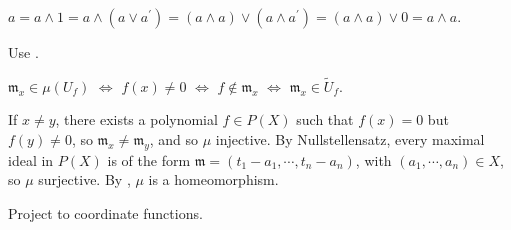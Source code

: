 \begin{exercise}\label{ex1.24}
	$a=a\wedge1=a\wedge\left(a\vee a^\prime\right)=(a\wedge a)\vee\left(a\wedge a^\prime\right)=(a\wedge a)\vee0=a\wedge a$.
\end{exercise}

\begin{exercise}\label{ex1.25}
	Use .
\end{exercise}

\begin{exercise}\label{ex1.26}
	$\mathfrak{m}_x\in\mu\left(U_f\right)$ $\Leftrightarrow$ $f(x)\neq0$ $\Leftrightarrow$ $f\notin\mathfrak{m}_x$
	$\Leftrightarrow$
	$\mathfrak{m}_x\in\tilde{U}_f$.
\end{exercise}

\begin{exercise}\label{ex1.27}
	If $x\neq y$, there exists a polynomial $f\in P(X)$ such that $f(x)=0$ but $f(y)\neq0$, so $\mathfrak{m}_x\neq\mathfrak{m}_y$, and so $\mu$ injective. By Nullstellensatz, every maximal ideal in $P(X)$ is of the form $\mathfrak{m}=\left(t_1-a_1,\cdots,t_n-a_n\right)$, with $\left(a_1,\cdots,a_n\right)\in X$, so $\mu$ surjective. By , $\mu$ is a homeomorphism.
\end{exercise}

\begin{exercise}\label{ex1.28}
	Project to coordinate functions.
\end{exercise}
